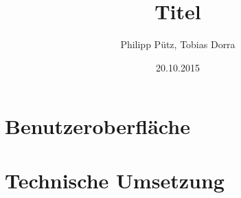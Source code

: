 \documentclass{report}
\title{Titel}
\author{Philipp Pütz, Tobias Dorra}
\date{20.10.2015}
\begin{document}
\maketitle
\tableofcontents

\chapter{Benutzeroberfläche}
\chapter{Technische Umsetzung}
\end{document}
